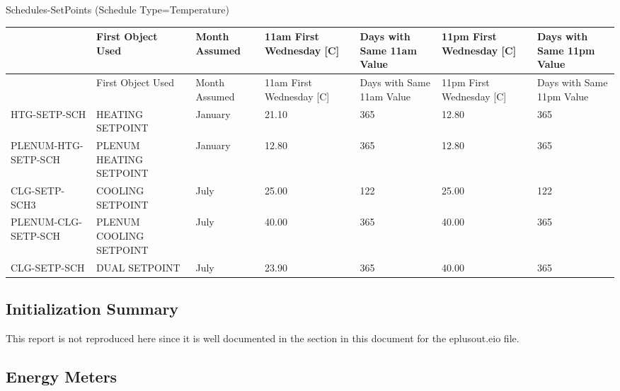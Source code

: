 Schedules-SetPoints (Schedule Type=Temperature)

\begin{longtable}[c]{>{\raggedright}p{0.85in}>{\raggedright}p{0.85in}>{\raggedright}p{0.85in}>{\raggedright}p{0.85in}>{\raggedright}p{0.85in}>{\raggedright}p{0.85in}>{\raggedright}p{0.85in}}
\toprule
 & First Object Used     & Month Assumed & 11am First Wednesday [C] & Days with Same 11am Value & 11pm First Wednesday [C] & Days with Same 11pm Value \tabularnewline
\midrule
\endfirsthead

\toprule
 & First Object Used     & Month Assumed & 11am First Wednesday [C] & Days with Same 11am Value & 11pm First Wednesday [C] & Days with Same 11pm Value \tabularnewline
\midrule
\endhead

    HTG-SETP-SCH       & HEATING SETPOINT       & January       &        21.10             &          365              &        12.80             &          365              \tabularnewline
    PLENUM-HTG-SETP-SCH & PLENUM HEATING SETPOINT & January       &        12.80             &          365              &        12.80             &          365              \tabularnewline
    CLG-SETP-SCH3      & COOLING SETPOINT       & July          &        25.00             &          122              &        25.00             &          122              \tabularnewline
    PLENUM-CLG-SETP-SCH & PLENUM COOLING SETPOINT & July          &        40.00             &          365              &        40.00             &          365              \tabularnewline
    CLG-SETP-SCH       & DUAL SETPOINT          & July          &        23.90             &          365              &        40.00             &          365              \tabularnewline

\bottomrule
\end{longtable}



\subsection{Initialization Summary}\label{initializatin-summary}

This report is not reproduced here since it is well documented in the section in this document for the eplusout.eio file.

\subsection{Energy Meters}\label{energy-meters}


